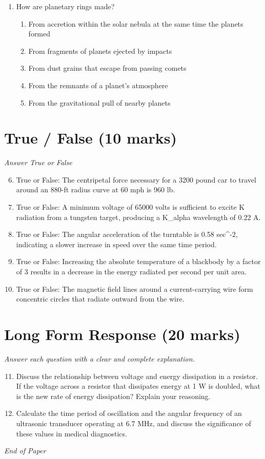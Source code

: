 \documentclass[12pt]{article}
\begin{document}
\begin{enumerate}[label=\arabic*.]
\begin{enumerate}[label=(\alph*)]
    \item 0.65
    \item 0.50
\end{enumerate}
\item How are planetary rings made?
\begin{enumerate}[label=(\alph*)]
    \item From accretion within the solar nebula at the same time the planets formed
    \item From fragments of planets ejected by impacts
    \item From dust grains that escape from passing comets
    \item From the remnants of a planet's atmosphere
    \item From the gravitational pull of nearby planets
\end{enumerate}
\end{enumerate}

\section*{True / False (10 marks)}
\textit{Answer True or False}
\begin{enumerate}[label=\arabic*.]
\setcounter{enumi}{5}
\item True or False: The centripetal force necessary for a 3200 pound car to travel around an 880-ft radius curve at 60 mph is 960 lb.
\item True or False: A minimum voltage of 65000 volts is sufficient to excite K radiation from a tungsten target, producing a K\_alpha wavelength of 0.22 A.
\item True or False: The angular acceleration of the turntable is 0.58 sec^-2, indicating a slower increase in speed over the same time period.
\item True or False: Increasing the absolute temperature of a blackbody by a factor of 3 results in a decrease in the energy radiated per second per unit area.
\item True or False: The magnetic field lines around a current-carrying wire form concentric circles that radiate outward from the wire.
\end{enumerate}

\section*{Long Form Response (20 marks)}
\textit{Answer each question with a clear and complete explanation.}
\begin{enumerate}[label=\arabic*.]
\setcounter{enumi}{10}
\item Discuss the relationship between voltage and energy dissipation in a resistor. If the voltage across a resistor that dissipates energy at 1 W is doubled, what is the new rate of energy dissipation? Explain your reasoning.
\item Calculate the time period of oscillation and the angular frequency of an ultrasonic transducer operating at 6.7 MHz, and discuss the significance of these values in medical diagnostics.
\end{enumerate}

\vfill
\noindent\textit{End of Paper}
\end{document}
